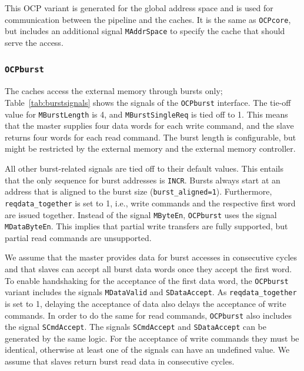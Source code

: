 \documentclass[a4paper,fontsize=10pt,twoside,DIV15,BCOR12mm,headinclude=true,footinclude=false,pagesize,bibtotoc]{scrbook}
\newcommand{\code}[1]{{\texttt{#1}}}
\newcommand{\comment}[3]{

\textsf{\textbf{#1}} {\color{#3}#2}}
\newcommand{\wolf}[1]{\comment{Wolfgang}{#1}{OliveGreen}}
\newcommand{\martin}[1]{\comment{Martin}{#1}{Blue}}
\renewcommand{\wolf}[1]{}
\renewcommand{\martin}[1]{}
\begin{document}
This OCP variant is generated for the global address space and is used
for communication between the pipeline and the caches. It is the same
as \code{OCPcore}, but includes an additional signal \code{MAddrSpace}
to specify the cache that should serve the access.

\subsubsection{\code{OCPburst}}

The caches access the external memory through bursts only;
Table~\ref{tab:burstsignals} shows the signals of the \code{OCPburst}
interface. The tie-off value for \code{MBurstLength} is 4, and
\code{MBurstSingleReq} is tied off to 1. This means that the master
supplies four data words for each write command, and the slave returns
four words for each read command. The burst length is configurable,
but might be restricted by the external memory and the external
memory controller.
\martin{I assume (hope) that the configurable burst length works.
One could try varying with the SRAM memory.} 
\wolf{Depends on how cleanly the code was written and on the
  hardware. The synchronous SRAM only supports burst lengths $\leq$4
  due to restrictions of the memory chip.}
All other burst-related signals are
tied off to their default values. This entails that the only sequence
for burst addresses is \code{INCR}. Bursts always start at an address
that is aligned to the burst size
(\code{burst\_aligned=1}). Furthermore, \code{reqdata\_together} is
set to 1, i.e., write commands and the respective first word are
issued together. Instead of the signal \code{MByteEn}, \code{OCPburst}
uses the signal \code{MDataByteEn}. This implies that partial write
transfers are fully supported, but partial read commands are
unsupported.

We assume that the master provides data for burst accesses in
consecutive cycles and that slaves can accept all burst data words
once they accept the first word. To enable handshaking for the
acceptance of the first data word, the \code{OCPburst} variant
includes the signals \code{MDataValid} and \code{SDataAccept}. As
\code{reqdata\_together} is set to 1, delaying the acceptance of data
also delays the acceptance of write commands. In order to do the same
for read commands, \code{OCPburst} also includes the signal
\code{SCmdAccept}. The signals \code{SCmdAccept} and
\code{SDataAccept} can be generated by the same logic. For the
acceptance of write commands they must be identical, otherwise at
least one of the signals can have an undefined value. We assume that
slaves return burst read data in consecutive cycles.
\end{document}
